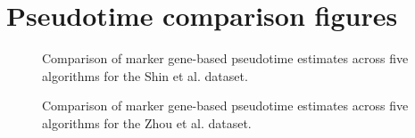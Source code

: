 \section{Pseudotime comparison figures}


\begin{figure}[h]
\centering

	\caption{Comparison of marker gene-based pseudotime estimates across five algorithms for the Shin et al. dataset.}
	\label{fig:shin-correlations}
\end{figure}

\begin{figure}[h]
\centering

	\caption{Comparison of marker gene-based pseudotime estimates across five algorithms for the Zhou et al. dataset.}
	\label{fig:zhou-correlations}
\end{figure}